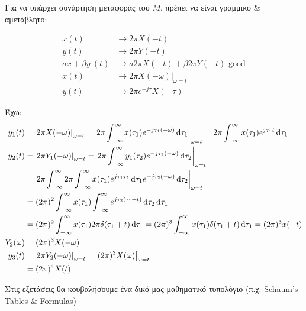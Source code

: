 \documentclass[11pt,a4paper,notitlepage,fleqn,final]{article}
\begin{document}
    Για να υπάρχει συνάρτηση μεταφοράς του \( M \), πρέπει να είναι γραμμικό \& αμετάβλητο:

    \begin{align*}
    	x(t) &\to 2\pi X(-t) \\
    	y(t) &\to 2\pi Y(-t) \\
    	ax+\beta y\ (t) &\to a2\pi X(-t) + \beta 2\pi Y(-t) \text{ good} \\[.3em]
    	x(t) &\to \left. 2\pi X(-\omega ) \right|_{\omega = t} \\
    	y(t) &\to 2\pi e^{-j\tau} X(-\tau)
    \end{align*}

    Έχω:
    \begin{align*}
    	y_1(t) &= \left. 2\pi X(-\omega )\right|_{\omega =t}
    	= \left.2\pi \int_{-\infty}^{\infty} x(\tau_1) e^{-j\tau_1(-\omega )}\dif\tau_1
    	\right|_{\omega =t}
    	=2\pi \int_{-\infty}^{\infty} x(\tau_1) e^{j\tau_1 t}\dif\tau_1 \\
    	y_2(t) &= \left. 2\pi Y_1(-\omega )\right|_{\omega =t}
    	= \left.2\pi \int_{-\infty}^{\infty} y_1(\tau_2) e^{-j\tau_2(-\omega )}\dif\tau_2
    	\right|_{\omega =t}
    	\\ &=\left. 2\pi \int_{-\infty}^{\infty} 2\pi
    	\int_{-\infty}^{\infty} x(\tau_1) e^{j\tau_1\tau_2}\dif\tau_1 e^{-j\tau_2(-\omega)}
    	\dif\tau_2\right|_{\omega = t}
    	\\ &= (2\pi)^2 \int_{-\infty}^{\infty} x(\tau_1) \int_{-\infty}^{\infty}
    	e^{j\tau_2(\tau_1+t)}\dif\tau_2\dif\tau_1
    	\\ &= (2\pi)^2 \int_{-\infty}^{\infty} x(\tau_1)2\pi \delta(\tau_1+t)\dif\tau_1
    	= (2\pi)^3 \int_{-\infty}^{\infty} x(\tau_1)\delta(\tau_1+t)\dif\tau_1 =
    	(2\pi)^3 x(-t) \\
    	Y_2(\omega) &= (2\pi)^3 X(-\omega) \\
    	y_3(t) &= \left. 2\pi Y_2(-\omega ) \right|_{\omega =t}
    	= \left. (2\pi)^3 X(\omega ) \right|_{\omega = t} \\ &= (2\pi)^4 X(t)
    \end{align*}

    \begin{attnbox}{}
    	Στις εξετάσεις θα κουβαλήσουμε ένα δικό μας μαθηματικό τυπολόγιο
    	(π.χ. Schaum's Tables \& Formulas)
    \end{attnbox}
\end{document}
